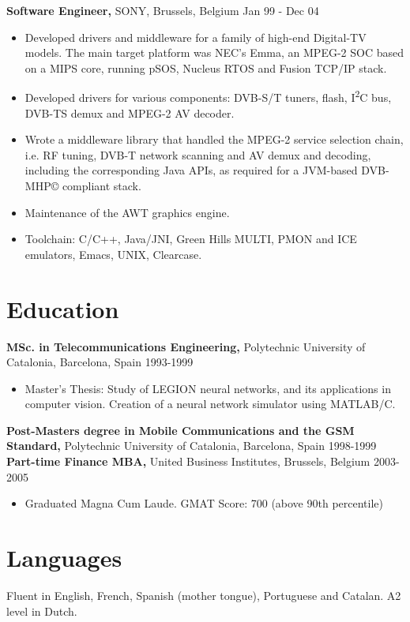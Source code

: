 \documentclass[margin]{res}
\begin{document}
\begin{resume}
{\bf Software Engineer,} SONY, Brussels, Belgium \hfill  Jan 99 - Dec 04
\begin{itemize} \itemsep -2pt %
\item Developed drivers and middleware for a family of high-end Digital-TV models. The main target platform was NEC’s Emma, an MPEG-2 SOC based on a MIPS core, running pSOS, Nucleus RTOS and Fusion TCP/IP stack.
\item Developed drivers for various components: DVB-S/T tuners, flash, I\textsuperscript{2}C bus, DVB-TS demux and MPEG-2 AV decoder.
\item Wrote a middleware library that handled the MPEG-2 service selection chain, i.e. RF tuning, DVB-T network scanning and AV demux and decoding, including the corresponding Java APIs, as required for a JVM-based DVB-MHP© compliant stack.
\item Maintenance of the AWT graphics engine.
\item Toolchain: C/C++, Java/JNI, Green Hills MULTI, PMON and ICE emulators, Emacs, UNIX, Clearcase.
\end{itemize}

\section{Education}
{ \bf MSc. in Telecommunications Engineering, } Polytechnic University of Catalonia, Barcelona, Spain \hfill 1993-1999
\begin{itemize} \itemsep -2pt
\item Master’s Thesis: Study of LEGION neural networks, and its applications in computer vision. Creation of a neural network simulator using MATLAB/C.
\end{itemize}

{ \bf Post-Masters degree in Mobile Communications and the GSM Standard, } Polytechnic University of Catalonia, Barcelona, Spain \hfill 1998-1999
\pagebreak
{ \bf Part-time Finance MBA, } United Business Institutes, Brussels, Belgium \hfill 2003-2005
\begin{itemize} \itemsep -2pt
\item Graduated Magna Cum Laude. GMAT Score: 700 (above 90th percentile)
\end{itemize}

\section{Languages}
Fluent in English, French, Spanish (mother tongue), Portuguese and Catalan. \newline
A2 level in Dutch.


\end{resume}
\end{document}
